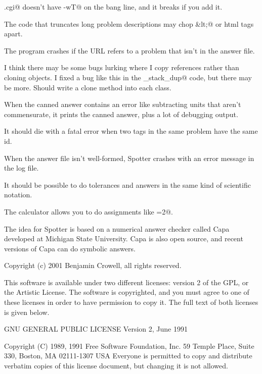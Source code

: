 \documentclass{doc}
\begin{document}
\verb@Spotter.cgi@ doesn't have \verb@-wT@ on the bang line, and it breaks
if you add it.

The code that truncates long problem descriptions may chop \verb@&lt;@ or html tags apart.

The program crashes if the URL refers to a problem that isn't in the answer file.

I think there may be some bugs lurking where I copy references rather than
cloning objects. I fixed a bug like this in the \verb@options_stack_dup@ code, but
there may be more. Should write a clone method into each class.


When the canned answer contains an error like subtracting units that aren't
commensurate, it prints the canned answer, plus a lot of debugging output.

It should die with a fatal error when two \verb@find@ tags in the same problem have
the same id.

When the answer file isn't well-formed, Spotter crashes with an error message in
the log file.

It should be possible to do tolerances and answers in the same kind of
scientific notation.


The calculator allows you to do assignments like =2@.

\label{acknowledgements}
The idea for Spotter is based on a numerical answer checker called Capa developed
at Michigan State University. Capa is also open source, and recent versions of
Capa can do symbolic answers.

\label{license}
Copyright (c) 2001 Benjamin Crowell, all rights reserved.

This software is available under two different licenses: 
  version 2 of the GPL, or
  the Artistic License. 
The software is copyrighted, and you must agree to one of
these licenses in order to have permission to copy it. The full
text of both licenses is given below.

		    GNU GENERAL PUBLIC LICENSE
		       Version 2, June 1991

 Copyright (C) 1989, 1991 Free Software Foundation, Inc.
                       59 Temple Place, Suite 330, Boston, MA  02111-1307  USA
 Everyone is permitted to copy and distribute verbatim copies
 of this license document, but changing it is not allowed.
\end{document}
